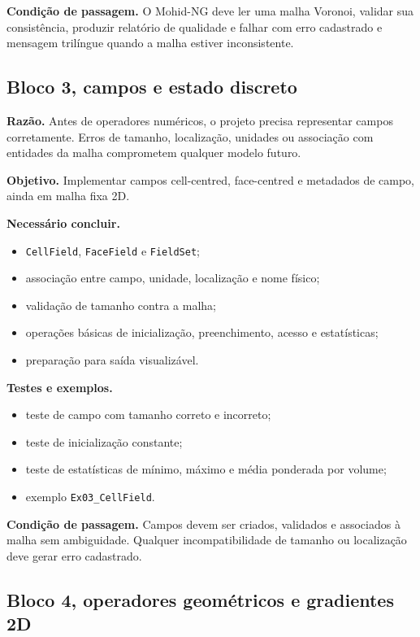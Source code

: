 \documentclass[11pt,a4paper]{article}
\begin{document}
\textbf{Condi\c{c}\~ao de passagem.} O Mohid-NG deve ler uma malha Voronoi, validar sua consist\^encia, produzir relat\'orio de qualidade e falhar com erro cadastrado e mensagem tril\'ingue quando a malha estiver inconsistente.

\subsection*{Bloco 3, campos e estado discreto}

\textbf{Raz\~ao.} Antes de operadores num\'ericos, o projeto precisa representar campos corretamente. Erros de tamanho, localiza\c{c}\~ao, unidades ou associa\c{c}\~ao com entidades da malha comprometem qualquer modelo futuro.

\textbf{Objetivo.} Implementar campos cell-centred, face-centred e metadados de campo, ainda em malha fixa 2D.

\textbf{Necess\'ario concluir.}
\begin{itemize}
  \item \texttt{CellField}, \texttt{FaceField} e \texttt{FieldSet};
  \item associa\c{c}\~ao entre campo, unidade, localiza\c{c}\~ao e nome f\'isico;
  \item valida\c{c}\~ao de tamanho contra a malha;
  \item opera\c{c}\~oes b\'asicas de inicializa\c{c}\~ao, preenchimento, acesso e estat\'isticas;
  \item prepara\c{c}\~ao para sa\'ida visualiz\'avel.
\end{itemize}

\textbf{Testes e exemplos.}
\begin{itemize}
  \item teste de campo com tamanho correto e incorreto;
  \item teste de inicializa\c{c}\~ao constante;
  \item teste de estat\'isticas de m\'inimo, m\'aximo e m\'edia ponderada por volume;
  \item exemplo \texttt{Ex03\_CellField}.
\end{itemize}

\textbf{Condi\c{c}\~ao de passagem.} Campos devem ser criados, validados e associados \`a malha sem ambiguidade. Qualquer incompatibilidade de tamanho ou localiza\c{c}\~ao deve gerar erro cadastrado.

\subsection*{Bloco 4, operadores geom\'etricos e gradientes 2D}
\end{document}
